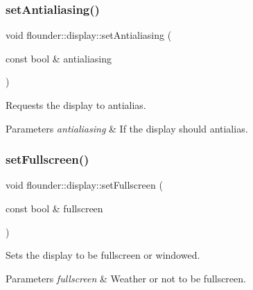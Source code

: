 \mbox{\label{classflounder_1_1display_ae9a340bfa09dfd6d08ebc0d21b4c77b0}} 
\subsubsection{\texorpdfstring{set\+Antialiasing()}{setAntialiasing()}}
{\footnotesize\ttfamily void flounder\+::display\+::set\+Antialiasing (\begin{DoxyParamCaption}\item[{const bool \&}]{antialiasing }\end{DoxyParamCaption})}



Requests the display to antialias. 


\begin{DoxyParams}{Parameters}
{\em antialiasing} & If the display should antialias. \\
\hline
\end{DoxyParams}
\mbox{\label{classflounder_1_1display_ae5ee27f982e6a947305dc6e71a23021b}} 
\subsubsection{\texorpdfstring{set\+Fullscreen()}{setFullscreen()}}
{\footnotesize\ttfamily void flounder\+::display\+::set\+Fullscreen (\begin{DoxyParamCaption}\item[{const bool \&}]{fullscreen }\end{DoxyParamCaption})}



Sets the display to be fullscreen or windowed. 


\begin{DoxyParams}{Parameters}
{\em fullscreen} & Weather or not to be fullscreen. \\
\hline
\end{DoxyParams}
\mbox{\label{classflounder_1_1display_ae1bf2028faaf411fedc80ca511a2e739}} 

